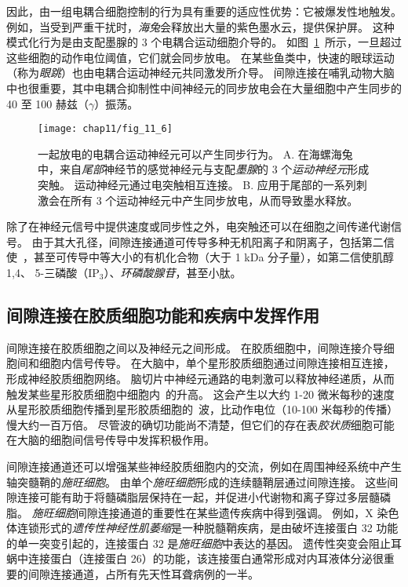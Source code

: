 因此，由一组电耦合细胞控制的行为具有重要的适应性优势：它被爆发性地触发。
例如，当受到严重干扰时，\textit{海兔}会释放出大量的紫色墨水云，提供保护屏。
这种模式化行为是由支配墨腺的 3 个电耦合运动细胞介导的。
如图~\ref{fig:11_6}~所示，一旦超过这些细胞的动作电位阈值，它们就会同步放电。
在某些鱼类中，快速的眼球运动（称为\textit{眼跳}）也由电耦合运动神经元共同激发所介导。
间隙连接在哺乳动物大脑中也很重要，其中电耦合抑制性中间神经元的同步放电会在大量细胞中产生同步的 40 至 100 赫兹（$\gamma$）振荡。


\begin{figure}[htbp]
	\centering
	\texttt{[image: chap11/fig\_11\_6]}
	\caption{一起放电的电耦合运动神经元可以产生同步行为\cite{carew1976two}。 
		A. 在海螺海兔中，来自\textit{尾部}神经节的感觉神经元与支配\textit{墨腺}的 3 个\textit{运动神经元}形成突触。
		运动神经元通过电突触相互连接。
		B. 应用于尾部的一系列刺激会在所有 3 个运动神经元中产生同步放电，从而导致墨水释放。}
	\label{fig:11_6}
\end{figure}


除了在神经元信号中提供速度或同步性之外，电突触还可以在细胞之间传递代谢信号。
由于其大孔径，间隙连接通道可传导多种无机阳离子和阴离子，包括第二信使~，甚至可传导中等大小的有机化合物（大于 1 kDa 分子量），如第二信使肌醇 1,4、 5-三磷酸（IP$_3$）、\textit{环磷酸腺苷}，甚至小肽。



\subsection{间隙连接在胶质细胞功能和疾病中发挥作用}

间隙连接在胶质细胞之间以及神经元之间形成。
在胶质细胞中，间隙连接介导细胞间和细胞内信号传导。 
在大脑中，单个星形胶质细胞通过间隙连接相互连接，形成神经胶质细胞网络。
脑切片中神经元通路的电刺激可以释放神经递质，从而触发某些星形胶质细胞中细胞内~的升高。
这会产生以大约 1-20 微米每秒的速度从星形胶质细胞传播到星形胶质细胞的~波，比动作电位（10-100 米每秒的传播）慢大约一百万倍。
尽管波的确切功能尚不清楚，但它们的存在表\textit{胶状质}细胞可能在大脑的细胞间信号传导中发挥积极作用。


间隙连接通道还可以增强某些神经胶质细胞内的交流，例如在周围神经系统中产生轴突髓鞘的\textit{施旺细胞}。
由单个\textit{施旺细胞}形成的连续髓鞘层通过间隙连接。
这些间隙连接可能有助于将髓磷脂层保持在一起，并促进小代谢物和离子穿过多层髓磷脂。
\textit{施旺细胞}间隙连接通道的重要性在某些遗传疾病中得到强调。
例如，X 染色体连锁形式的\textit{遗传性神经性肌萎缩}是一种脱髓鞘疾病，是由破坏连接蛋白 32 功能的单一突变引起的，连接蛋白 32 是\textit{施旺细胞}中表达的基因。
遗传性突变会阻止耳蜗中连接蛋白（连接蛋白 26）的功能，该连接蛋白通常形成对内耳液体分泌很重要的间隙连接通道，占所有先天性耳聋病例的一半。



